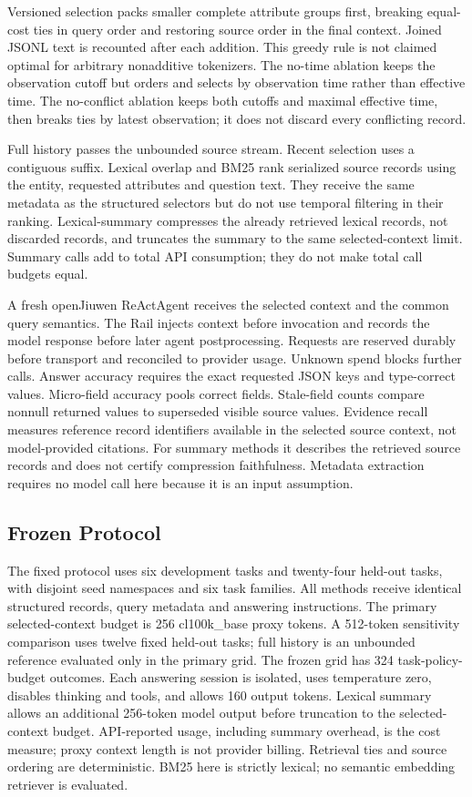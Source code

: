 \documentclass{article}
\begin{document}
Versioned selection packs smaller complete attribute groups first, breaking equal-cost ties in query order and restoring source order in the final context. Joined JSONL text is recounted after each addition. This greedy rule is not claimed optimal for arbitrary nonadditive tokenizers. The no-time ablation keeps the observation cutoff but orders and selects by observation time rather than effective time. The no-conflict ablation keeps both cutoffs and maximal effective time, then breaks ties by latest observation; it does not discard every conflicting record.

Full history passes the unbounded source stream. Recent selection uses a contiguous suffix. Lexical overlap and BM25 rank serialized source records using the entity, requested attributes and question text. They receive the same metadata as the structured selectors but do not use temporal filtering in their ranking. Lexical-summary compresses the already retrieved lexical records, not discarded records, and truncates the summary to the same selected-context limit. Summary calls add to total API consumption; they do not make total call budgets equal.

A fresh openJiuwen ReActAgent receives the selected context and the common query semantics. The Rail injects context before invocation and records the model response before later agent postprocessing. Requests are reserved durably before transport and reconciled to provider usage. Unknown spend blocks further calls. Answer accuracy requires the exact requested JSON keys and type-correct values. Micro-field accuracy pools correct fields. Stale-field counts compare nonnull returned values to superseded visible source values. Evidence recall measures reference record identifiers available in the selected source context, not model-provided citations. For summary methods it describes the retrieved source records and does not certify compression faithfulness. Metadata extraction requires no model call here because it is an input assumption.
\subsection{Frozen Protocol}
The fixed protocol uses six development tasks and twenty-four held-out tasks, with disjoint seed namespaces and six task families. All methods receive identical structured records, query metadata and answering instructions. The primary selected-context budget is 256 cl100k\_base proxy tokens. A 512-token sensitivity comparison uses twelve fixed held-out tasks; full history is an unbounded reference evaluated only in the primary grid. The frozen grid has 324 task-policy-budget outcomes. Each answering session is isolated, uses temperature zero, disables thinking and tools, and allows 160 output tokens. Lexical summary allows an additional 256-token model output before truncation to the selected-context budget. API-reported usage, including summary overhead, is the cost measure; proxy context length is not provider billing. Retrieval ties and source ordering are deterministic. BM25 here is strictly lexical; no semantic embedding retriever is evaluated.
\end{document}
